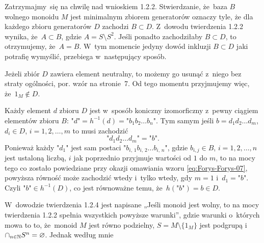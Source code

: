 \documentclass[a4paper,11pt]{article}
\begin{document}
\start {} Zatrzymajmy~się na chwilę nad wnioskiem 1.2.2. Stwierdzanie, że~baza $B$ wolnego monoidu $M$ jest minimalnym zbiorem generatorów oznaczy tyle, że dla każdego zbioru generatorów $D$ zachodzi $B \subset D$. Z~dowodu twierdzenia 1.2.2 wynika, że~$A \subset B$, gdzie $A = S \setminus S^{ 2 }$. Jeśli ponadto zachodziłaby $B \subset D$, to otrzymujemy, że~$A = B$. W~tym momencie jedyny dowód inkluzji $B \subset D$ jaki potrafię wymyślić,
przebiega
w~następujący sposób.

Jeżeli zbiór $D$ zawiera element neutralny, to możemy go usunąć z~niego bez straty ogólności, por. wzór na stronie~7. Od tego momentu przyjmujemy więc, że~$1_{ M } \notin D$.

Każdy element $d$ zbioru $D$ jest w~sposób koniczny izomorficzny z~pewny ciągiem elementów zbioru $B$:
$\texttt{"} d \texttt{"} = h^{ -1 }( d ) = \texttt{"} b_{ 1 } b_{ 2 } \ldots b_{ n } \texttt{"}$. Tym samym jeśli $b = d_{ 1 } d_{ 2 } \ldots d_{ m }$, $d_{ i } \in D$, $i = 1, 2, \ldots, m$ to musi zachodzić
\begin{equation}
  \label{eq:8}
  \texttt{"} d_{ 1 } d_{ 2 } \ldots d_{ m } \texttt{"} = \texttt{"} b \texttt{"}.
\end{equation}
Ponieważ każdy $\textrm{"} d_{ 1 } \textrm{"}$ jest sam postaci $\texttt{"} b_{ i,\, 1 } b_{ i,\, 2 } \ldots b_{ i,\, n } \texttt{"}$, gdzie $b_{ i, j } \in B$, $i = 1, 2, \ldots, n$ jest ustaloną liczbą, $i$ jak poprzednio przyjmuje wartości od $1$ do $m$, to na mocy tego co zostało powiedziane przy okazji omawiania wzoru \eqref{eq:Forys-Forys-07}, powyższa równość może zachodzić wtedy i~tylko wtedy, gdy $m = 1$ i~$d_{ 1 } = \texttt{"} b \texttt{"}$. Czyli $\texttt{"} b \texttt{"} \in h^{ -1 }( D )$, co jest równoważne temu, że~$h( \texttt{"} b \texttt{"} ) = b \in D$.


\vspace{\spaceFour}



\start {} W~dowodzie twierdzenia 1.2.4 jest napisane „Jeśli monoid jest wolny, to na mocy twierdzenia 1.2.2 spełnia wszystkich powyższe warunki”, gdzie warunki o~których mowa to to, że~monoid $M$ jest równo podzielny, $S = M \setminus \{ 1_{ M } \}$ jest podgrupą i~$\cap_{ n \in \mathbb{N} } S^{ n } = \varnothing$. Jednak według mnie




\end{document}
